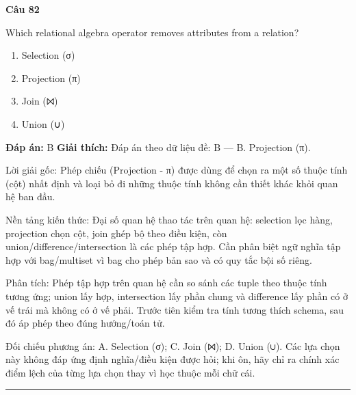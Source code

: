 \documentclass[11pt,a4paper]{article}
\newenvironment{question}[1]{%
  \par\vspace{1em}\noindent\textbf{\large Câu #1}\par\vspace{0.4em}
}{%
  \par\vspace{1em}\hrule\vspace{0.6em}
}
\newenvironment{choices}{%
  \begin{enumerate}[label=\textbf{\Alph*.},leftmargin=2.2em,itemsep=2pt,topsep=3pt]
}{%
  \end{enumerate}
}
\newcommand{\choice}{\item}
\begin{document}
\begin{question}{82}
Which relational algebra operator removes attributes from a relation?
\begin{choices}
\choice Selection (σ)
\choice Projection (π)
\choice Join (⨝)
\choice Union (∪)
\end{choices}
\textbf{Đáp án:} B
\textbf{Giải thích:} Đáp án theo dữ liệu đề: B — B. Projection (π).

Lời giải gốc: Phép chiếu (Projection - π) được dùng để chọn ra một số thuộc tính (cột) nhất định và loại bỏ đi những thuộc tính không cần thiết khác khỏi quan hệ ban đầu.

Nền tảng kiến thức: Đại số quan hệ thao tác trên quan hệ: selection lọc hàng, projection chọn cột, join ghép bộ theo điều kiện, còn union/difference/intersection là các phép tập hợp. Cần phân biệt ngữ nghĩa tập hợp với bag/multiset vì bag cho phép bản sao và có quy tắc bội số riêng.

Phân tích: Phép tập hợp trên quan hệ cần so sánh các tuple theo thuộc tính tương ứng; union lấy hợp, intersection lấy phần chung và difference lấy phần có ở vế trái mà không có ở vế phải. Trước tiên kiểm tra tính tương thích schema, sau đó áp phép theo đúng hướng/toán tử.

Đối chiếu phương án: A. Selection (σ); C. Join (⨝); D. Union (∪). Các lựa chọn này không đáp ứng định nghĩa/điều kiện được hỏi; khi ôn, hãy chỉ ra chính xác điểm lệch của từng lựa chọn thay vì học thuộc mỗi chữ cái.
\end{question}
\end{document}
